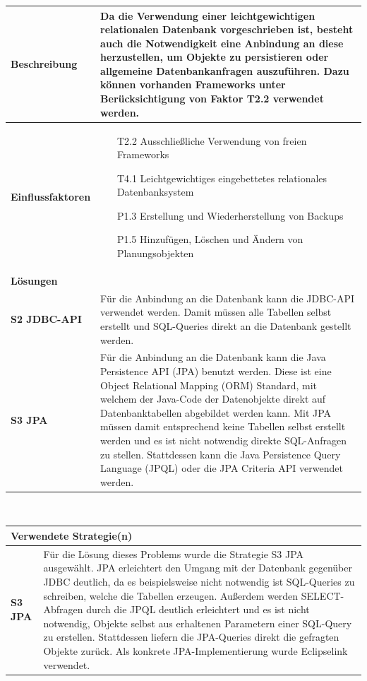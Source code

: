 \documentclass[fontsize=12pt,paper=a4,twoside]{scrartcl}
\begin{document}
\begin{tabularx}{\textwidth}{|p{6cm}|X|}
 \hline
 \textbf{Beschreibung} & Da die Verwendung einer leichtgewichtigen relationalen Datenbank vorgeschrieben ist, besteht auch die Notwendigkeit eine Anbindung an diese herzustellen, um Objekte zu persistieren oder allgemeine Datenbankanfragen auszuführen. Dazu können vorhanden Frameworks unter Berücksichtigung von Faktor T2.2 verwendet werden.\\\hline
 \textbf{Einflussfaktoren} &
 \begin{itemize}
\item[T2.2] Ausschließliche Verwendung von freien Frameworks
\item[T4.1] Leichtgewichtiges eingebettetes relationales Datenbanksystem
\item[P1.3] Erstellung und Wiederherstellung von Backups
\item[P1.5] Hinzufügen, Löschen und Ändern von Planungsobjekten
 \end{itemize}\\\hline
\multicolumn{2}{|l|}{\textbf{Lösungen}} \\\hline
\textbf{S2 JDBC-API} & Für die Anbindung an die Datenbank kann die JDBC-API verwendet werden. Damit müssen alle Tabellen selbst erstellt und SQL-Queries direkt an die Datenbank gestellt werden. \\

\textbf{S3 JPA} & Für die Anbindung an die Datenbank kann die Java Persistence API (JPA) benutzt werden. Diese ist eine Object Relational Mapping (ORM) Standard, mit welchem der Java-Code der Datenobjekte direkt auf Datenbanktabellen abgebildet werden kann. Mit JPA müssen damit entsprechend keine Tabellen selbst erstellt werden und es ist nicht notwendig direkte SQL-Anfragen zu stellen. Stattdessen kann die Java Persistence Query Language (JPQL) oder die JPA Criteria API verwendet werden. \\\hline
\end{tabularx}\\

\newpage

\begin{tabularx}{\textwidth}{|p{6cm}|X|}
 \hline
\multicolumn{2}{|l|}{\textbf{Verwendete Strategie(n)}} \\\hline
 \textbf{S3 JPA}   & Für die Lösung dieses Problems wurde die Strategie S3 JPA ausgewählt. JPA erleichtert den Umgang mit der Datenbank gegenüber JDBC deutlich, da es beispielsweise nicht notwendig ist SQL-Queries zu schreiben, welche die Tabellen erzeugen. Außerdem werden SELECT-Abfragen durch die JPQL deutlich erleichtert und es ist nicht notwendig, Objekte selbst aus erhaltenen Parametern einer SQL-Query zu erstellen. Stattdessen liefern die JPA-Queries direkt die gefragten Objekte zurück. Als konkrete JPA-Implementierung wurde Eclipselink verwendet.\\\hline
\end{tabularx}
\end{document}
